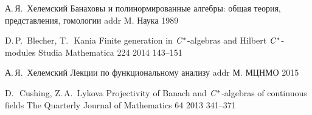 \documentclass[12pt]{article}
\numberwithin{equation}{subsection}
\theoremstyle{plain}
\begin{document}
\begin{thebibliography}{99}
    \by{} А.\,Я.~Хелемский 
    \book{} Банаховы и полинормированные алгебры: общая теория, 
    представления, гомологии 
    \publ{}addr M.
    \publ{} Наука 
    \yr{} 1989

    \by{} D.\,P.~Blecher, T.\,~Kania 
    \paper{} Finite generation in $\it{C^*}$-algebras 
        and Hilbert $\it{C^*}$-modules 
    \jour{} Studia Mathematica 
    \vol{} 224 
    \yr{} 2014 
    \pages{} 143--151

    \by{} А.\,Я.~Хелемский 
    \book{} Лекции по функциональному анализу 
    \publ{}addr М. 
    \publ{} МЦНМО 
    \yr{} 2015


    \by{} D.\,~Cushing, Z.\,A.~Lykova
    \paper{} Projectivity of Banach and $\it{C^*}$-algebras of continuous fields
    \jour{} The Quarterly Journal of Mathematics 
    \vol{} 64 
    \yr{} 2013 
    \pages{} 341--371

\end{thebibliography}
\end{document}
